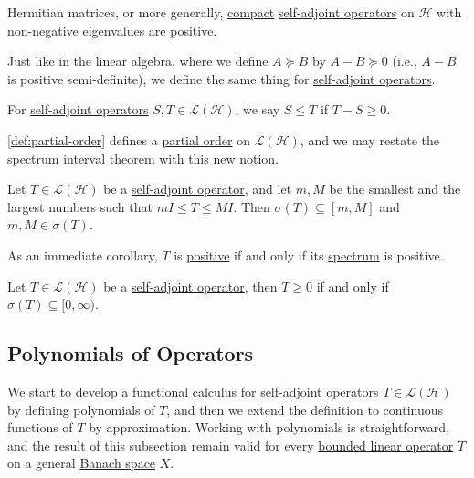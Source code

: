 \begin{eg}
	Hermitian matrices, or more generally, \hyperref[def:compact-op]{compact} \hyperref[def:self-adjoint-op]{self-adjoint operators} on \(\mathcal{H} \) with non-negative eigenvalues are \hyperref[def:positive-op]{positive}.
\end{eg}

Just like in the linear algebra, where we define \(A \succeq B\) by \(A - B \succeq 0\) (i.e., \(A-B\) is positive semi-definite), we define the same thing for \hyperref[def:self-adjoint-op]{self-adjoint operators}.

\begin{definition}\label{def:partial-order}
	For \hyperref[def:self-adjoint-op]{self-adjoint operators} \(S, T\in \mathcal{L} (\mathcal{H} )\), we say \(S \leq T\) if \(T - S \geq 0\).
\end{definition}

\autoref{def:partial-order} defines a \href{https://en.wikipedia.org/wiki/Partially_ordered_set}{partial order} on \(\mathcal{L} (\mathcal{H} )\), and we may restate the \hyperref[thm:spectrum-interval]{spectrum interval theorem} with this new notion.

\begin{theorem}\label{thm:spectrum-interval-2}
	Let \(T\in \mathcal{L} (\mathcal{H} )\) be a \hyperref[def:self-adjoint-op]{self-adjoint operator}, and let \(m, M\) be the smallest and the largest numbers such that \(mI \leq T \leq MI\). Then \(\sigma (T) \subseteq [m, M]\) and \(m, M\in \sigma (T)\).
\end{theorem}

As an immediate corollary, \(T\) is \hyperref[def:positive-op]{positive} if and only if its \hyperref[def:spectrum-point]{spectrum} is positive.

\begin{corollary}
	Let \(T\in \mathcal{L} (\mathcal{H} )\) be a \hyperref[def:self-adjoint-op]{self-adjoint operator}, then \(T \geq 0\) if and only if \(\sigma (T) \subseteq [0, \infty )\).
\end{corollary}

\subsection{Polynomials of Operators}
We start to develop a functional calculus for \hyperref[def:self-adjoint-op]{self-adjoint operators} \(T\in \mathcal{L} (\mathcal{H} )\) by defining polynomials of \(T\), and then we extend the definition to continuous functions of \(T\) by approximation. Working with polynomials is straightforward, and the result of this subsection remain valid for every \hyperref[def:bounded-linear-op]{bounded linear operator} \(T\) on a general \hyperref[def:Banach-space]{Banach space} \(X\).

